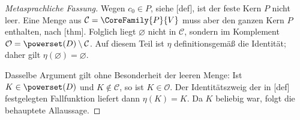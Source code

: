 \documentclass[main.tex]{subfiles}
\begin{document}
\begin{proof}[Metasprachliche Fassung]
Wegen \(c_0\in P\), siehe
[def], ist der feste Kern \(P\)
nicht leer. Eine Menge aus \(\mathcal C=\CoreFamily{P}{V}\) muss aber
den ganzen Kern \(P\) enthalten, nach
[thm]. Folglich liegt
\(\varnothing\) nicht in \(\mathcal C\), sondern im Komplement
\(\mathcal O=\powerset(D)\setminus\mathcal C\). Auf diesem Teil ist
\(\eta\) definitionsgemäß die Identität; daher gilt
\(\eta(\varnothing)=\varnothing\).

Dasselbe Argument gilt ohne Besonderheit der leeren Menge: Ist
\(K\in\powerset(D)\) und \(K\notin\mathcal C\), so ist
\(K\in\mathcal O\). Der Identitätszweig der in
[def] festgelegten
Fallfunktion liefert dann \(\eta(K)=K\). Da \(K\) beliebig war, folgt
die behauptete Allaussage.
\end{proof}

\MogTableProofHeading
\begin{tabproofwide}
\end{tabproofwide}
\end{document}
